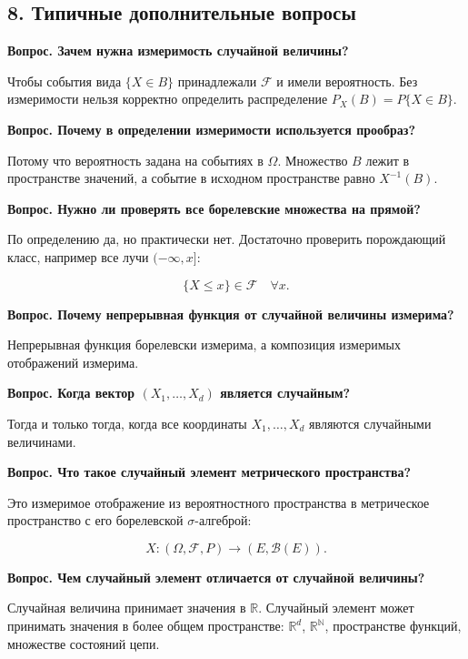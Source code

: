 \documentclass[
  11pt,
  a4paper,
]{article}
\begin{document}
\subsection{8. Типичные дополнительные
вопросы}\label{ux442ux438ux43fux438ux447ux43dux44bux435-ux434ux43eux43fux43eux43bux43dux438ux442ux435ux43bux44cux43dux44bux435-ux432ux43eux43fux440ux43eux441ux44b}

\textbf{Вопрос. Зачем нужна измеримость случайной величины?}

Чтобы события вида \(\{X\in B\}\) принадлежали \(\mathcal F\) и имели
вероятность. Без измеримости нельзя корректно определить распределение
\(P_X(B)=P\{X\in B\}\).

\textbf{Вопрос. Почему в определении измеримости используется прообраз?}

Потому что вероятность задана на событиях в \(\Omega\). Множество \(B\)
лежит в пространстве значений, а событие в исходном пространстве равно
\(X^{-1}(B)\).

\textbf{Вопрос. Нужно ли проверять все борелевские множества на прямой?}

По определению да, но практически нет. Достаточно проверить порождающий
класс, например все лучи \((-\infty,x]\):

\[
\{X\le x\}\in\mathcal F\quad \forall x.
\]

\textbf{Вопрос. Почему непрерывная функция от случайной величины
измерима?}

Непрерывная функция борелевски измерима, а композиция измеримых
отображений измерима.

\textbf{Вопрос. Когда вектор \((X_1,\ldots,X_d)\) является случайным?}

Тогда и только тогда, когда все координаты \(X_1,\ldots,X_d\) являются
случайными величинами.

\textbf{Вопрос. Что такое случайный элемент метрического пространства?}

Это измеримое отображение из вероятностного пространства в метрическое
пространство с его борелевской \(\sigma\)-алгеброй:

\[
X:(\Omega,\mathcal F,P)\to(E,\mathcal B(E)).
\]

\textbf{Вопрос. Чем случайный элемент отличается от случайной величины?}

Случайная величина принимает значения в \(\mathbb R\). Случайный элемент
может принимать значения в более общем пространстве: \(\mathbb R^d\),
\(\mathbb R^{\mathbb N}\), пространстве функций, множестве состояний
цепи.
\end{document}
